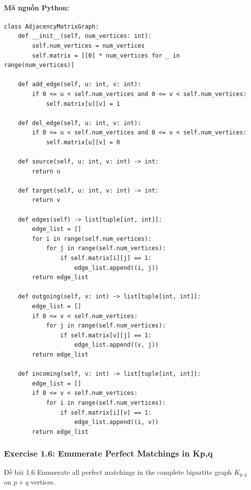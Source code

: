 \documentclass[a4paper,12pt]{article}
\begin{document}
\paragraph{Mã nguồn Python:}
\begin{lstlisting}[style=pythonstyle, caption={Lớp biểu diễn đồ thị bằng Ma trận Kề.}]
class AdjacencyMatrixGraph:
    def __init__(self, num_vertices: int):
        self.num_vertices = num_vertices
        self.matrix = [[0] * num_vertices for _ in range(num_vertices)]

    def add_edge(self, u: int, v: int):
        if 0 <= u < self.num_vertices and 0 <= v < self.num_vertices:
            self.matrix[u][v] = 1

    def del_edge(self, u: int, v: int):
        if 0 <= u < self.num_vertices and 0 <= v < self.num_vertices:
            self.matrix[u][v] = 0

    def source(self, u: int, v: int) -> int:
        return u
        
    def target(self, u: int, v: int) -> int:
        return v

    def edges(self) -> list[tuple[int, int]]:
        edge_list = []
        for i in range(self.num_vertices):
            for j in range(self.num_vertices):
                if self.matrix[i][j] == 1:
                    edge_list.append((i, j))
        return edge_list

    def outgoing(self, v: int) -> list[tuple[int, int]]:
        edge_list = []
        if 0 <= v < self.num_vertices:
            for j in range(self.num_vertices):
                if self.matrix[v][j] == 1:
                    edge_list.append((v, j))
        return edge_list
        
    def incoming(self, v: int) -> list[tuple[int, int]]:
        edge_list = []
        if 0 <= v < self.num_vertices:
            for i in range(self.num_vertices):
                if self.matrix[i][v] == 1:
                    edge_list.append((i, v))
        return edge_list
\end{lstlisting}

\subsubsection{Exercise 1.6: Enumerate Perfect Matchings in Kp,q}
\begin{problembox}{Đề bài 1.6}
    Enumerate all perfect matchings in the complete bipartite graph $K_{p,q}$ on $p+q$ vertices.
\end{problembox}
\end{document}
